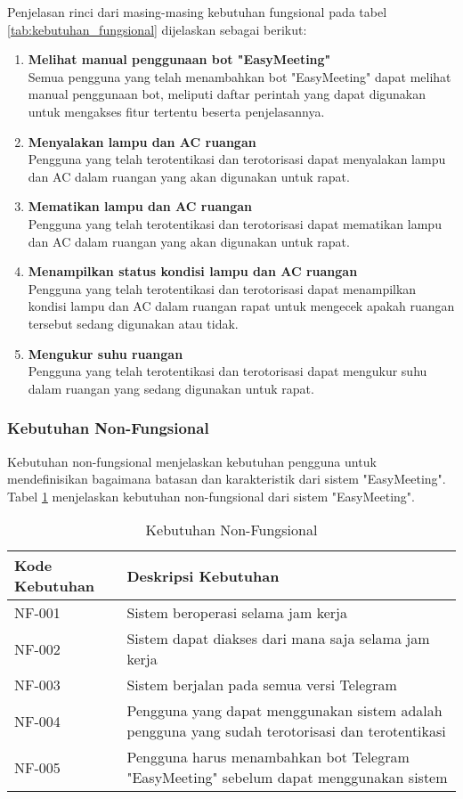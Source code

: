 Penjelasan rinci dari masing-masing kebutuhan fungsional pada tabel \ref{tab:kebutuhan_fungsional} dijelaskan sebagai berikut:
\begin{enumerate}
	\item \textbf{Melihat manual penggunaan bot "EasyMeeting"} \\
	\tab Semua pengguna yang telah menambahkan bot "EasyMeeting" dapat melihat manual penggunaan bot, meliputi daftar perintah yang dapat digunakan untuk mengakses fitur tertentu beserta penjelasannya.
	\item \textbf{Menyalakan lampu dan AC ruangan} \\
	\tab Pengguna yang telah terotentikasi dan terotorisasi dapat menyalakan lampu dan AC dalam ruangan yang akan digunakan untuk rapat.
	\item \textbf{Mematikan lampu dan AC ruangan} \\
	\tab Pengguna yang telah terotentikasi dan terotorisasi dapat mematikan lampu dan AC dalam ruangan yang akan digunakan untuk rapat.
	\item \textbf{Menampilkan status kondisi lampu dan AC ruangan} \\
	\tab Pengguna yang telah terotentikasi dan terotorisasi dapat menampilkan kondisi lampu dan AC dalam ruangan rapat untuk mengecek apakah ruangan tersebut sedang digunakan atau tidak.
	\item \textbf{Mengukur suhu ruangan} \\
	\tab Pengguna yang telah terotentikasi dan terotorisasi dapat mengukur suhu dalam ruangan yang sedang digunakan untuk rapat.
\end{enumerate}

\subsubsection{Kebutuhan Non-Fungsional}
\tab Kebutuhan non-fungsional menjelaskan kebutuhan pengguna untuk mendefinisikan bagaimana batasan dan karakteristik dari sistem "EasyMeeting". Tabel \ref{tab:kebutuhan_non_fungsional} menjelaskan kebutuhan non-fungsional dari sistem "EasyMeeting".

\begin{table}[H]
	\centering
	\begin{tabular}{ | p{3cm} | p{6cm} | }
		\hline
		\textbf{Kode Kebutuhan} & \textbf{Deskripsi Kebutuhan} \\ \hline
		NF-001 & Sistem beroperasi selama jam kerja \\ \hline
		NF-002 & Sistem dapat diakses dari mana saja selama jam kerja \\ \hline
		NF-003 & Sistem berjalan pada semua versi Telegram \\ \hline
		NF-004 & Pengguna yang dapat menggunakan sistem adalah pengguna yang sudah terotorisasi dan terotentikasi \\ \hline
		NF-005 & Pengguna harus menambahkan bot Telegram "EasyMeeting" sebelum dapat menggunakan sistem \\ \hline
	\end{tabular} \caption{Kebutuhan Non-Fungsional}
	\label{tab:kebutuhan_non_fungsional}
\end{table}

